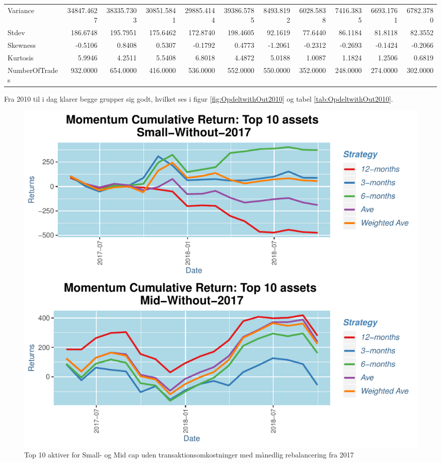 \documentclass[]{article}
\begin{document}
\begin{table}
{\begin{tabular}[t]{lrrrrrrrrrr}
Variance & 34847.4627 & 38335.7303 & 30851.5841 & 29885.4144 & 39386.5785 & 8493.8192 & 6028.5838 & 7416.3835 & 6693.1761 & 6782.3780\\
Stdev & 186.6748 & 195.7951 & 175.6462 & 172.8740 & 198.4605 & 92.1619 & 77.6440 & 86.1184 & 81.8118 & 82.3552\\
Skewness & -0.5106 & 0.8408 & 0.5307 & -0.1792 & 0.4773 & -1.2061 & -0.2312 & -0.2693 & -0.1424 & -0.2066\\
\addlinespace
Kurtosis & 5.9946 & 4.2511 & 5.5408 & 6.8018 & 4.4872 & 5.0188 & 1.0087 & 1.1824 & 1.2506 & 0.6819\\
NumberOfTrades & 932.0000 & 654.0000 & 416.0000 & 536.0000 & 552.0000 & 550.0000 & 352.0000 & 248.0000 & 274.0000 & 302.0000\\
\bottomrule
\end{tabular}}
\end{table}

Fra 2010 til i dag klarer begge grupper sig godt, hvilket ses i figur
\ref{fig:OpdeltwithOut2010} og tabel \ref{tab:OpdeltwithOut2010}.

\begin{figure}
\centering
\includegraphics{IPA_Small_and_Mid_files/figure-latex/fig2-1.pdf}
\caption{\label{fig:OpdeltwithOut2017}Top 10 aktiver for Small- og Mid
cap uden transaktionsomkostninger med månedlig rebalancering fra 2017}
\end{figure}
\end{document}
